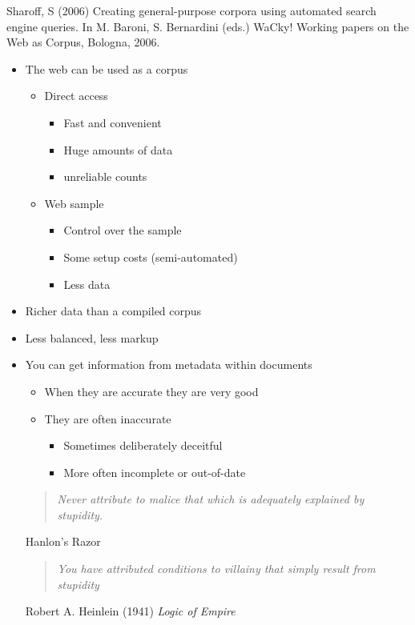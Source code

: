 \documentclass[a4paper,landscape,headrule,footrule,xetex]{foils}
\begin{document}
Sharoff, S (2006) Creating general-purpose corpora using automated search engine queries. In M. Baroni, S. Bernardini (eds.) WaCky! Working papers on the Web as Corpus, Bologna, 2006.

\MyLogo{}
 
\begin{itemize}
\item The web can be used as a corpus
  \begin{itemize}
  \item Direct access
    \begin{itemize}
    \item Fast and convenient
    \item Huge amounts of data
    \item[\Bad] unreliable counts 
    \end{itemize}
  \item Web sample
    \begin{itemize}
    \item Control over the sample
    \item Some setup costs (semi-automated)
    \item[\Bad] Less data 
    \end{itemize}
  \end{itemize}
\item Richer data than a compiled corpus
\item[\Bad] Less balanced, less markup
\end{itemize}


\MyLogo{}
\begin{itemize}
\item You can get information from metadata within documents
  \begin{itemize}
  \item When they are accurate they are very good
  \item They are often inaccurate
    \begin{itemize}
    \item Sometimes deliberately deceitful
    \item More often incomplete or out-of-date
    \end{itemize}
  \end{itemize}
      \begin{quote} \itshape
    Never attribute to malice that which is adequately explained by stupidity.

     \end{quote} %
      \begin{flushright}
               Hanlon's Razor
      \end{flushright}
      \begin{quote} \itshape
        You have attributed conditions to villainy 
        that simply result from stupidity
      \end{quote}
       \begin{flushright}
         Robert A. Heinlein (1941) \textit{Logic of Empire}
       \end{flushright}
\end{itemize}
\end{document}
